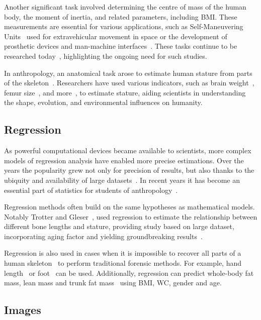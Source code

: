 Another significant task involved determining the centre of mass of the human body, the moment of inertia, and related parameters, including BMI. These measurements are essential for various applications, such as Self-Maneuvering Units~\cite{bodyInertia} used for extravehicular movement in space or the development of prosthetic devices and man-machine interfaces~\cite{bodyInertia2}. These tasks continue to be researched today~\cite{bodyMotion}, highlighting the ongoing need for such studies.

In anthropology, an anatomical task arose to estimate human stature from parts of the skeleton~\cite{skeletonHeight}. Researchers have used various indicators, such as brain weight~\cite{brainStature}, femur size~\cite{femurStature}, and more~\cite{statureHistory}, to estimate stature, aiding scientists in understanding the shape, evolution, and environmental influences on humanity.
\subsection{Regression}
As powerful computational devices became available to scientists, more complex models of regression analysis have enabled more precise estimations. Over the years the popularity grew not only for precision of results, but also thanks to the ubiquity and availability  of large datasets~\cite{regressionStature}. In recent years it has become an essential part of statistics for students of anthropology~\cite{regressionStudents}.

Regression methods often build on the same hypotheses as mathematical models. Notably Trotter and Gleser~\cite{regressionBig}, used regression to estimate the relationship between different bone lengths and stature, providing study based on large dataset, incorporating aging factor and yielding groundbreaking results~\cite{statureComparisons}.

Regression is also used in cases when it is impossible to recover all parts of a human skeleton~\cite{regressionBulk} to perform traditional forensic methods. For example, hand length~\cite{regressionHandFoot, regressionHand, handNew, handNew2} or foot~\cite{regressionHandFoot,regressionFoot} can be used. Additionally, regression can predict whole-body fat mass, lean mass and trunk fat mass~\cite{regressionBodyFat} using BMI, WC, gender and age. 

\subsection{Images}

